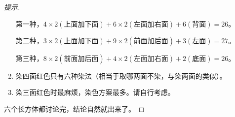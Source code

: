 \begin{proof}[提示]
\begin{enumerate}
    第一种，$4\times2(\text{上面加下面})+6\times2(\text{左面加右面})+6(\text{背面})=26$。

    第二种，$3\times2(\text{上面加下面})+9\times2(\text{前面加后面})+3(\text{左面})=27$。

    第三种，$8\times2(\text{前面加后面})+4\times2(\text{左面加右面})+2(\text{底面})=26$。

  \item 染四面红色只有六种染法（相当于取哪两面不染，与染两面的类似）。
  \item 染三面红色时最麻烦，染色方案最多。请自行考虑。
  \end{enumerate}

  六个长方体都讨论完，结论自然就出来了。
\end{proof}